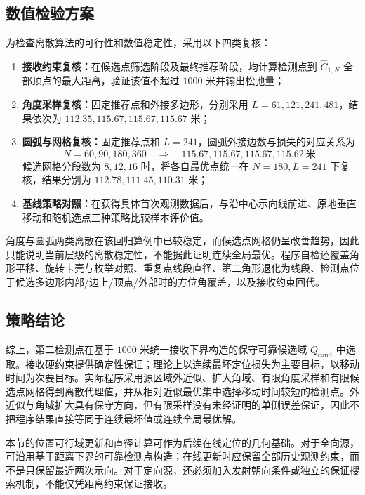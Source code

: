 \subsection{数值检验方案}

为检查离散算法的可行性和数值稳定性，采用以下四类复核：
\begin{enumerate}
  \item \textbf{接收约束复核：}在候选点筛选阶段及最终推荐阶段，均计算检测点到 $\widehat C_{1,N}$ 全部顶点的最大距离，验证该值不超过 $1000$ 米并输出松弛量；
  \item \textbf{角度采样复核：}固定推荐点和外接多边形，分别采用 $L=61,121,241,481$，结果依次为 $112.35,115.67,115.67,115.67$ 米；
  \item \textbf{圆弧与网格复核：}固定推荐点和 $L=241$，圆弧外接边数与损失的对应关系为
  \[
    N=60,90,180,360
    \quad\Longrightarrow\quad
    115.67,115.67,115.67,115.62\ \text{米}.
  \]
  候选网格分段数为 $8,12,16$ 时，将各自最优点统一在 $N=180,L=241$ 下复核，结果分别为 $112.78,111.45,110.31$ 米；
  \item \textbf{基线策略对照：}在获得具体首次观测数据后，与沿中心示向线前进、原地垂直移动和随机选点三种策略比较样本评价值。
\end{enumerate}
角度与圆弧两类离散在该回归算例中已较稳定，而候选点网格仍呈改善趋势，因此只能说明当前层级的离散稳定性，不能据此证明连续全局最优。程序自检还覆盖角形平移、旋转卡壳与枚举对照、重复点线段直径、第二角形退化为线段、检测点位于候选多边形内部/边上/顶点/外部时的方位角覆盖，以及接收约束回代。

\subsection{策略结论}

综上，第二检测点在基于 $1000$ 米统一接收下界构造的保守可靠候选域 $Q_{\mathrm{cand}}$ 中选取。接收硬约束提供确定性保证；理论上以连续最坏定位损失为主要目标，以移动时间为次要目标。实际程序采用源区域外近似、扩大角域、有限角度采样和有限候选点网格得到离散代理值，并从相对近似最优集中选择移动时间较短的检测点。外近似与角域扩大具有保守方向，但有限采样没有未经证明的单侧误差保证，因此不把程序结果直接等同于连续最坏值或连续全局最优解。

本节的位置可行域更新和直径计算可作为后续在线定位的几何基础。对于全向源，可沿用基于距离下界的可靠检测点构造；在线更新时应保留全部历史观测约束，而不是只保留最近两次示向。对于定向源，还必须加入发射朝向条件或独立的保证搜索机制，不能仅凭距离约束保证接收。

